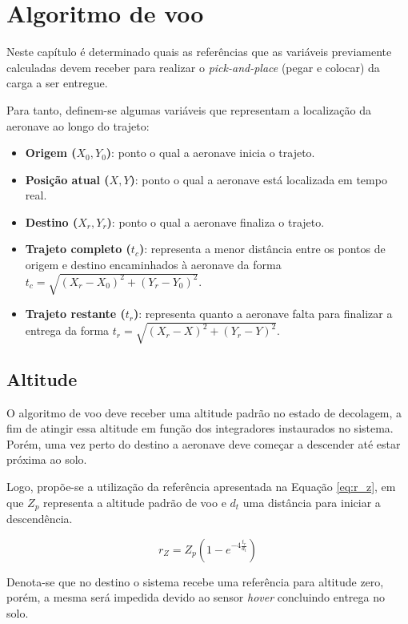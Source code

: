 \documentclass[main.tex]{subfiles}
\begin{document}
\chapter{Algoritmo de voo}\label{cap:controle_voo}

Neste capítulo é determinado quais as referências que as variáveis previamente calculadas devem receber para realizar o \textit{pick-and-place} (pegar e colocar) da carga a ser entregue.

Para tanto, definem-se algumas variáveis que representam a localização da aeronave ao longo do trajeto:

\begin{itemize}
    \item \textbf{Origem ($X_0,Y_0$)}: ponto o qual a aeronave inicia o trajeto.
    \item \textbf{Posição atual ($X,Y$)}: ponto o qual a aeronave está localizada em tempo real.
    \item \textbf{Destino ($X_r,Y_r$)}: ponto o qual a aeronave finaliza o trajeto.
    \item \textbf{Trajeto completo ($t_c$)}: representa a menor distância entre os pontos de origem e destino encaminhados à aeronave da forma $t_c = \sqrt{(X_r - X_0)^2 + (Y_r - Y_0)^2}$.
    \item \textbf{Trajeto restante ($t_r$)}: representa quanto a aeronave falta para finalizar a entrega da forma $t_r = \sqrt{(X_r - X)^2 + (Y_r - Y)^2}$.
\end{itemize}

\section{Altitude}

O algoritmo de voo deve receber uma altitude padrão no estado de decolagem, a fim de atingir essa altitude em função dos integradores instaurados no sistema. Porém, uma vez perto do destino a aeronave deve começar a descender até estar próxima ao solo.

Logo, propõe-se a utilização da referência apresentada na Equação \ref{eq:r_z}, em que $Z_{p}$ representa a altitude padrão de voo e $d_t$ uma distância para iniciar a descendência.

\begin{equation}\label{eq:r_z}
    r_Z = Z_{p}\left(1 - e^{-4\frac{t_r}{d_t}}\right)
\end{equation}

Denota-se que no destino o sistema recebe uma referência para altitude zero, porém, a mesma será impedida devido ao sensor \textit{hover} concluindo entrega no solo.
\end{document}

